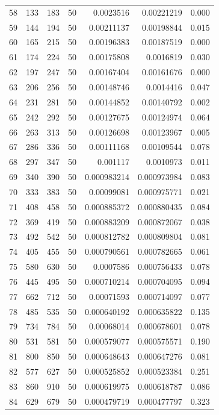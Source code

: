 \begin{tabular}{r r r r r r r}
58 & 133 & 183 & 50 & 0.0023516 & 0.00221219 & 0.000 \\
59 & 144 & 194 & 50 & 0.00211137 & 0.00198844 & 0.015 \\
60 & 165 & 215 & 50 & 0.00196383 & 0.00187519 & 0.000 \\
61 & 174 & 224 & 50 & 0.00175808 & 0.0016819 & 0.030 \\
62 & 197 & 247 & 50 & 0.00167404 & 0.00161676 & 0.000 \\
63 & 206 & 256 & 50 & 0.00148746 & 0.0014416 & 0.047 \\
64 & 231 & 281 & 50 & 0.00144852 & 0.00140792 & 0.002 \\
65 & 242 & 292 & 50 & 0.00127675 & 0.00124974 & 0.064 \\
66 & 263 & 313 & 50 & 0.00126698 & 0.00123967 & 0.005 \\
67 & 286 & 336 & 50 & 0.00111168 & 0.00109544 & 0.078 \\
68 & 297 & 347 & 50 & 0.001117 & 0.0010973 & 0.011 \\
69 & 340 & 390 & 50 & 0.000983214 & 0.000973984 & 0.083 \\
70 & 333 & 383 & 50 & 0.00099081 & 0.000975771 & 0.021 \\
71 & 408 & 458 & 50 & 0.000885372 & 0.000880435 & 0.084 \\
72 & 369 & 419 & 50 & 0.000883209 & 0.000872067 & 0.038 \\
73 & 492 & 542 & 50 & 0.000812782 & 0.000809804 & 0.081 \\
74 & 405 & 455 & 50 & 0.000790561 & 0.000782665 & 0.061 \\
75 & 580 & 630 & 50 & 0.0007586 & 0.000756433 & 0.078 \\
76 & 445 & 495 & 50 & 0.000710214 & 0.000704095 & 0.094 \\
77 & 662 & 712 & 50 & 0.00071593 & 0.000714097 & 0.077 \\
78 & 485 & 535 & 50 & 0.000640192 & 0.000635822 & 0.135 \\
79 & 734 & 784 & 50 & 0.00068014 & 0.000678601 & 0.078 \\
80 & 531 & 581 & 50 & 0.000579077 & 0.000575571 & 0.190 \\
81 & 800 & 850 & 50 & 0.000648643 & 0.000647276 & 0.081 \\
82 & 577 & 627 & 50 & 0.000525852 & 0.000523384 & 0.251 \\
83 & 860 & 910 & 50 & 0.000619975 & 0.000618787 & 0.086 \\
84 & 629 & 679 & 50 & 0.000479719 & 0.000477797 & 0.323 \\

\end{tabular}
